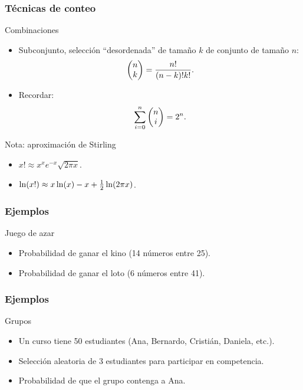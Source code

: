 \documentclass[table]{beamer}
\begin{document}
\begin{frame}
    \frametitle{Técnicas de conteo}
    \begin{block}{Combinaciones}
        \begin{itemize}
            \item Subconjunto, selección ``desordenada'' de tamaño $k$ de conjunto de tamaño $n$:
                \begin{equation*}
                    \begin{pmatrix}
                        n \\ k
                    \end{pmatrix}
                    = \frac{n !}{\parens{n - k} ! k !} .
                \end{equation*}
            \item Recordar:
                \begin{equation*}
                    \sum_{i = 0}^{n} \begin{pmatrix} n \\ i \end{pmatrix} = 2^{n} .
                \end{equation*}
        \end{itemize}
    \end{block}
    \begin{block}{Nota: aproximación de Stirling}
        \begin{itemize}
            \item $x ! \approx x^{x} e^{- x} \sqrt{2 \pi x}$.
            \item $\ln \parens{x !} \approx x \ln \parens{x} - x + \frac{1}{2} \ln \parens{2 \pi x}$.
        \end{itemize}
    \end{block}
\end{frame}

\begin{frame}
    \frametitle{Ejemplos}
    \begin{block}{Juego de azar}
        \begin{itemize}
            \item Probabilidad de ganar el kino (14 números entre 25).
            \item Probabilidad de ganar el loto (6 números entre 41).
        \end{itemize}
    \end{block}
\end{frame}

\begin{frame}
    \frametitle{Ejemplos}
    \begin{block}{Grupos}
        \begin{itemize}
            \item Un curso tiene 50 estudiantes (Ana, Bernardo, Cristián, Daniela, etc.).
            \item Selección aleatoria de 3 estudiantes para participar en competencia.
            \item Probabilidad de que el grupo contenga a Ana.
        \end{itemize}
    \end{block}
\end{frame}
\end{document}
